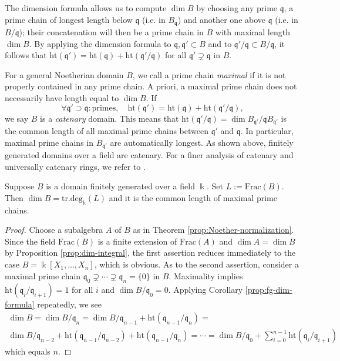 The dimension formula allows us to compute $\dim B$ by choosing any prime $\mathfrak{q}$, a prime chain of longest length below $\mathfrak{q}$ (i.e. in $B_{\mathfrak{q}}$) and another one above $\mathfrak{q}$ (i.e. in $B/\mathfrak{q}$); their concatenation will then be a prime chain in $B$ with maximal length $\dim B$. By applying the dimension formula to $\mathfrak{q}, \mathfrak{q}' \subset B$ and to $\mathfrak{q}'/\mathfrak{q} \subset B/\mathfrak{q}$, it follows that $\text{ht}(\mathfrak{q}') = \text{ht}(\mathfrak{q}) + \text{ht}(\mathfrak{q}'/\mathfrak{q})$ for all $\mathfrak{q}' \supsetneq \mathfrak{q}$ in $B$.

For a general Noetherian domain $B$, we call a prime chain \emph{maximal} if it is not properly contained in any prime chain. A priori, a maximal prime chain does not necessarily have length equal to $\dim B$. If
\[ \forall \mathfrak{q}' \supset \mathfrak{q}: \text{primes}, \quad \text{ht}(\mathfrak{q}') = \text{ht}(\mathfrak{q}) + \text{ht}(\mathfrak{q}'/\mathfrak{q}), \]
we say $B$ is a \emph{catenary} domain. This means that $\text{ht}(\mathfrak{q}'/\mathfrak{q}) = \dim B_{\mathfrak{q}'}/\mathfrak{q}B_{\mathfrak{q}'}$ is the common length of all maximal prime chains between $\mathfrak{q}'$ and $\mathfrak{q}$. In particular, maximal prime chains in $B_{\mathfrak{q}'}$ are automatically longest. As shown above, finitely generated domains over a field are catenary. For a finer analysis of catenary and universally catenary rings, we refer to \cite[\S 14]{Mat80}.

\begin{corollary}
	Suppose $B$ is a domain finitely generated over a field $\Bbbk$. Set $L := \mathrm{Frac}(B)$. Then $\dim B = \mathrm{tr.deg}_\Bbbk(L)$ and it is the common length of maximal prime chains.
\end{corollary}
\begin{proof}
	Choose a subalgebra $A$ of $B$ as in Theorem \ref{prop:Noether-normalization}. Since the field $\text{Frac}(B)$ is a finite extension of $\text{Frac}(A)$ and $\dim A = \dim B$ by Proposition \ref{prop:dim-integral}, the first assertion reduces immediately to the case $B = \Bbbk[X_1, \ldots, X_n]$, which is obvious. As to the second assertion, consider a maximal prime chain $\mathfrak{q}_0 \supsetneq \cdots \supsetneq \mathfrak{q}_n = \{0\}$ in $B$. Maximality implies $\text{ht}(\mathfrak{q}_i/\mathfrak{q}_{i+1}) = 1$ for all $i$ and $\dim B/\mathfrak{q}_0 = 0$. Applying Corollary \ref{prop:fg-dim-formula} repeatedly, we see
	\begin{multline*}
		\dim B = \dim B/\mathfrak{q}_n = \dim B/\mathfrak{q}_{n-1} + \text{ht}(\mathfrak{q}_{n-1}/\mathfrak{q}_n) = \\
		\dim B/\mathfrak{q}_{n-2} + \text{ht}(\mathfrak{q}_{n-1}/\mathfrak{q}_{n-2}) + \text{ht}(\mathfrak{q}_{n-1}/\mathfrak{q}_n) = \cdots = \dim B/\mathfrak{q}_0 + \sum_{i=0}^{n-1} \text{ht}(\mathfrak{q}_i/\mathfrak{q}_{i+1})
	\end{multline*}
	which equals $n$.
\end{proof}

